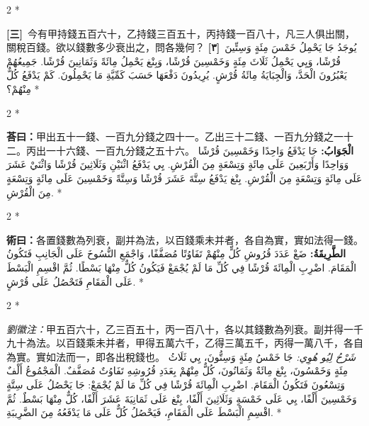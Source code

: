 \documentclass[11pt,a4paper]{article}
\newcommand{\ar}[1]{\arabicfont\beginR #1\endR}
\newcommand{\problemnum}[1]{\textbf{[\ignorespaces#1\unskip]}}
\newenvironment{bilingual}{%
  \begin{paracol}{2}%
  \switchcolumn[0]*%
}{%
  \end{paracol}%
}
\newcommand{\cnline}[1]{\switchcolumn[0]\noindent #1 \switchcolumn[1]}
\newcommand{\arline}[1]{\noindent\ar{#1} \switchcolumn[0]*}
\newenvironment{prob bilingual}{%
  \begin{paracol}{2}%
  \switchcolumn[0]*%
}{%
  \end{paracol}%
  \vspace{0.3em}%
}
\begin{document}
\begin{bilingual}
\cnline{\problemnum{三}\, 今有甲持錢五百六十，乙持錢三百五十，丙持錢一百八十，凡三人俱出關，關稅百錢。欲以錢數多少衰出之，問各幾何？}
\arline{\problemnum{٣}\, يُوجَدُ جَا يَحْمِلُ خَمْسَ مِئَةٍ وَسِتِّينَ قُرْشًا، وَيِي يَحْمِلُ ثَلَاثَ مِئَةٍ وَخَمْسِينَ قُرْشًا، وَبِنْغ يَحْمِلُ مِائَةً وَثَمَانِينَ قُرْشًا. جَمِيعُهُمْ يَعْبُرُونَ الْحَدَّ، وَالْجِبَايَةُ مِائَةُ قُرْشٍ. يُرِيدُونَ دَفْعَهَا حَسَبَ كَمِّيَّةِ مَا يَحْمِلُونَ. كَمْ يَدْفَعُ كُلٌّ مِنْهُمْ؟}
\end{bilingual}

\begin{bilingual}
\cnline{\textcolor{answercolor}{\textbf{荅曰：}}甲出五十一錢、一百九分錢之四十一。乙出三十二錢、一百九分錢之一十二。丙出一十六錢、一百九分錢之五十六。}
\arline{\textcolor{answercolor}{\textbf{الْجَوَابُ:}} جَا يَدْفَعُ وَاحِدًا وَخَمْسِينَ قُرْشًا وَوَاحِدًا وَأَرْبَعِينَ عَلَى مِائَةٍ وَتِسْعَةٍ مِنَ الْقُرْشِ. يِي يَدْفَعُ اثْنَيْنِ وَثَلَاثِينَ قُرْشًا وَاثْنَيْ عَشَرَ عَلَى مِائَةٍ وَتِسْعَةٍ مِنَ الْقُرْشِ. بِنْغ يَدْفَعُ سِتَّةَ عَشَرَ قُرْشًا وَسِتَّةً وَخَمْسِينَ عَلَى مِائَةٍ وَتِسْعَةٍ مِنَ الْقُرْشِ.}
\end{bilingual}

\begin{bilingual}
\cnline{%
\textcolor{methodcolor}{\textbf{術曰：}}各置錢數為列衰，副并為法，以百錢乘未并者，各自為實，實如法得一錢。
}
\arline{%
\textcolor{methodcolor}{\textbf{الطَّرِيقَةُ:}} ضَعْ عَدَدَ قُرُوشِ كُلٍّ مِنْهُمْ تَفَاوُتًا مُصَفَّفًا، وَاجْمَعِ النُّسُوخَ عَلَى الْجَانِبِ فَتَكُونُ الْمَقَامَ. اضْرِبِ الْمِائَةَ قُرْشًا فِي كُلِّ مَا لَمْ يُجْمَعْ فَيَكُونُ كُلٌّ مِنْهَا بَسْطًا. ثُمَّ اقْسِمِ الْبَسْطَ عَلَى الْمَقَامِ فَتَحْصُلُ عَلَى قُرْشٍ.
}
\end{bilingual}

\begin{bilingual}
\cnline{%
\textcolor{commentarycolor}{\small\textit{劉徽注：}}甲五百六十，乙三百五十，丙一百八十，各以其錢數為列衰。副并得一千九十為法。以百錢乘未并者，甲得五萬六千，乙得三萬五千，丙得一萬八千，各自為實。實如法而一，即各出稅錢也。
}
\arline{%
\textcolor{commentarycolor}{\small\textit{شَرْحُ لِيُو هُوِي:}} جَا خَمْسُ مِئَةٍ وَسِتُّونَ، يِي ثَلَاثُ مِئَةٍ وَخَمْسُونَ، بِنْغ مِائَةٌ وَثَمَانُونَ، كُلٌّ مِنْهُمْ بِعَدَدِ قُرُوشِهِ تَفَاوُتٌ مُصَفَّفٌ. الْمَجْمُوعُ أَلْفٌ وَتِسْعُونَ فَتَكُونُ الْمَقَامَ. اضْرِبِ الْمِائَةَ قُرْشًا فِي كُلِّ مَا لَمْ يُجْمَعْ: جَا يَحْصُلُ عَلَى سِتَّةٍ وَخَمْسِينَ أَلْفًا، يِي عَلَى خَمْسَةٍ وَثَلَاثِينَ أَلْفًا، بِنْغ عَلَى ثَمَانِيَةَ عَشَرَ أَلْفًا، كُلٌّ مِنْهَا بَسْطٌ. ثُمَّ اقْسِمِ الْبَسْطَ عَلَى الْمَقَامِ، فَيَحْصُلُ كُلٌّ عَلَى مَا يَدْفَعُهُ مِنَ الضَّرِيبَةِ.
}
\end{bilingual}
\end{document}
